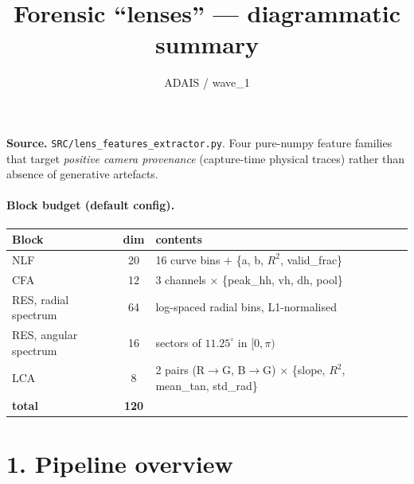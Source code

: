 \documentclass[11pt]{article}
\title{Forensic ``lenses'' --- diagrammatic summary}
\author{ADAIS / wave\_1}
\date{}
\begin{document}
\maketitle

\noindent
\textbf{Source.}
\texttt{SRC/lens\_features\_extractor.py}.  Four pure-numpy feature families
that target \emph{positive camera provenance} (capture-time physical traces)
rather than absence of generative artefacts.

\paragraph{Block budget (default config).}
\begin{center}
\small
\begin{tabular}{lcl}
\toprule
Block & dim & contents \\
\midrule
NLF                       & 20 & 16 curve bins $+$ \{a, b, $R^2$, valid\_frac\}\\
CFA                       & 12 & 3 channels $\times$ \{peak\_hh, vh, dh, pool\}\\
RES, radial spectrum      & 64 & log-spaced radial bins, L1-normalised\\
RES, angular spectrum     & 16 & sectors of $11.25^{\circ}$ in $[0,\pi)$\\
LCA                       &  8 & 2 pairs (R$\to$G, B$\to$G) $\times$ \{slope, $R^2$, mean\_tan, std\_rad\}\\
\midrule
\textbf{total}            & \textbf{120} & \\
\bottomrule
\end{tabular}
\end{center}

\bigskip

\section*{1. Pipeline overview}
\end{document}
